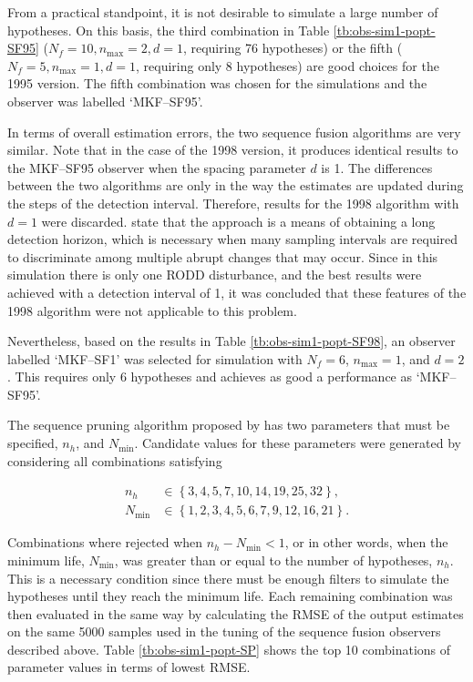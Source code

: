 From a practical standpoint, it is not desirable to simulate a large number of hypotheses. On this basis, the third combination in Table \ref{tb:obs-sim1-popt-SF95} ($N_f=10,n_\text{max}=2,d=1$, requiring 76 hypotheses) or the fifth ($N_f=5,n_\text{max}=1,d=1$, requiring only 8 hypotheses) are good choices for the 1995 version. The fifth combination was chosen for the simulations and the observer was labelled `MKF--SF95'. 

In terms of overall estimation errors, the two sequence fusion algorithms are very similar. Note that in the case of the 1998 version, it produces identical results to the MKF--SF95 observer when the spacing parameter $d$ is 1. The differences between the two algorithms are only in the way the estimates are updated during the steps of the detection interval. Therefore, results for the 1998 algorithm with $d=1$ were discarded. \cite{robertson_method_1998} state that the approach is a means of obtaining a long detection horizon, which is necessary when many sampling intervals are required to discriminate among multiple abrupt changes that may occur. Since in this simulation there is only one \gls{RODD} disturbance, and the best results were achieved with a detection interval of 1, it was concluded that these features of the 1998 algorithm were not applicable to this problem.

Nevertheless, based on the results in Table \ref{tb:obs-sim1-popt-SF98}, an observer labelled `MKF--SF1' was selected for simulation with $N_f=6$, $n_\text{max}=1$, and $d=2$. This requires only 6 hypotheses and achieves as good a performance as `MKF--SF95'.

The sequence pruning algorithm proposed by \cite{eriksson_classification_1996} has two parameters that must be specified, $n_h$, and $N_\text{min}$. Candidate values for these parameters were generated by considering all combinations satisfying

\begin{equation} \label{eq:sim-sys-siso-MKF-SP-param-values}
	\begin{aligned}
		n_h &\in \left\{3, 4, 5, 7, 10, 14, 19, 25, 32\right\},  \\
		N_\text{min} &\in \left\{1, 2, 3, 4, 5, 6, 7, 9, 12, 16, 21\right\}.
	\end{aligned}
\end{equation}

Combinations where rejected when $n_h - N_\text{min} < 1$, or in other words, when the minimum life, $N_\text{min}$, was greater than or equal to the number of hypotheses, $n_h$. This is a necessary condition since there must be enough filters to simulate the hypotheses until they reach the minimum life. Each remaining combination was then evaluated in the same way by calculating the \gls{RMSE} of the output estimates on the same 5000 samples used in the tuning of the sequence fusion observers described above. Table \ref{tb:obs-sim1-popt-SP} shows the top 10 combinations of parameter values in terms of lowest \gls{RMSE}.


